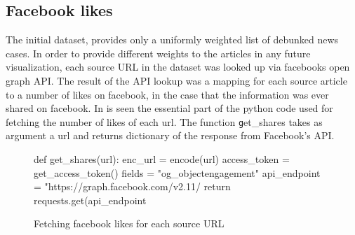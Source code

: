 \documentclass{article}
\begin{document}
\subsection{Facebook likes}
The initial dataset, provides only a uniformly weighted list of debunked news cases. In order to provide different weights to the articles in any future visualization, each source URL in the dataset was looked up via facebooks open graph API. The result of the API lookup was a mapping for each source article to a number of likes on facebook, in the case that the information was ever shared on facebook. In  is seen the essential part of the python code used for fetching the number of likes of each url. The function {\texttt get\_shares} takes as argument a url and returns dictionary of the response from Facebook's API.

\begin{figure}[H]
\caption{Fetching facebook likes for each source URL}
\label{fig:fetch_likes}
\begin{python}
def get_shares(url):
    enc_url = encode(url)
    access_token = get_access_token()
    fields = "og_object{engagement}"
    api_endpoint = "https://graph.facebook.com/v2.11/%
    return requests.get(api_endpoint %
\end{python}
\end{figure}
\end{document}
